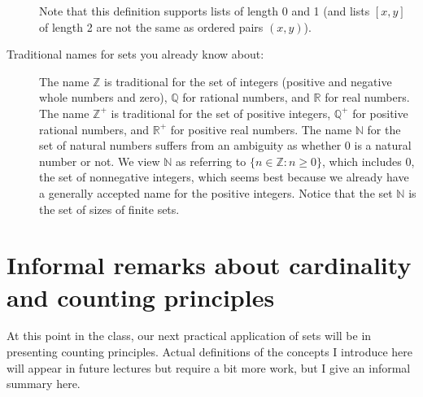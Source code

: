 \documentclass[12pt]{article}
\begin{document}
\begin{description}
Note that this definition supports lists of length 0 and 1 (and lists $[x,y]$ of length 2 are not the same as ordered pairs $(x,y)$).

\item[Traditional names for sets you already know about:]  The name $\mathbb Z$ is traditional for the set of integers (positive and negative whole numbers and zero), $\mathbb Q$ for rational numbers, and $\mathbb R$ for real numbers.  The name $\mathbb Z^+$ is traditional for the set of positive integers, $\mathbb Q^+$ for positive  rational numbers, and $\mathbb R^+$ for positive real numbers.   The name $\mathbb N$ for the set of natural numbers suffers from an ambiguity as whether 0 is a natural number or not.  We view $\mathbb N$ as referring to $\{n \in \mathbb Z:n \geq 0\}$, which includes 0, the set of nonnegative integers, which seems best because we already have a generally accepted name for the positive integers.  Notice that the set $\mathbb N$ is the set of sizes of finite sets.

\end{description}

\newpage

\section{Informal remarks about cardinality and counting principles}

At this point in the class, our next practical application of sets will be in presenting counting principles.  Actual definitions of the concepts I introduce here will appear in future lectures but require a bit more work, but I give an informal summary here.
\end{document}
